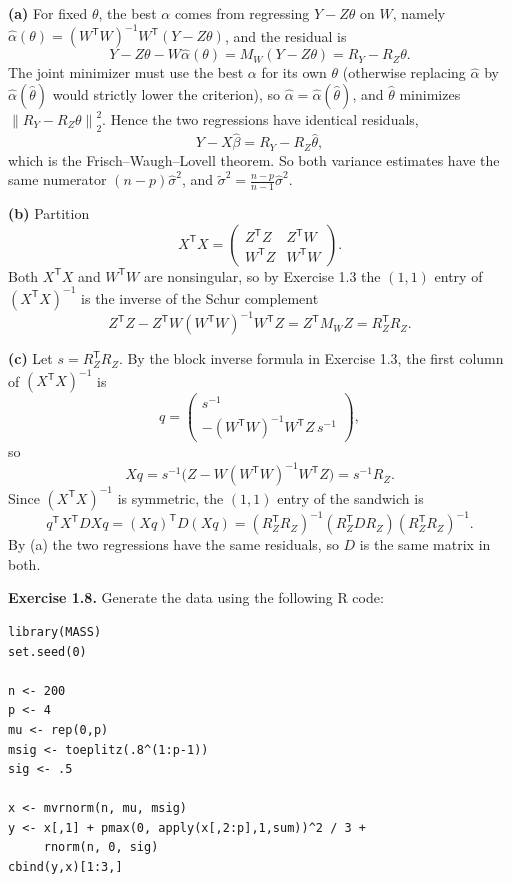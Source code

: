 \documentclass[answers,12pt,addpoints]{exam}
\newcommand{\trans}{^{\mathsf T}}
\newcommand{\normtwo}[1]{\left\lVert #1\right\rVert_2}
\begin{document}
\begin{questions}
\begin{solution}
\textbf{(a)} For fixed $\theta$, the best $\alpha$ comes from regressing
$Y-Z\theta$ on $W$, namely
$\widehat\alpha(\theta)=(W\trans W)^{-1}W\trans(Y-Z\theta)$, and the residual is
\[
Y-Z\theta-W\widehat\alpha(\theta)=M_W(Y-Z\theta)=R_Y-R_Z\theta .
\]
The joint minimizer must use the best $\alpha$ for its own $\theta$ (otherwise
replacing $\widehat\alpha$ by $\widehat\alpha(\widehat\theta)$ would strictly
lower the criterion), so $\widehat\alpha=\widehat\alpha(\widehat\theta)$, and
$\widehat\theta$ minimizes $\normtwo{R_Y-R_Z\theta}^2$. Hence the two
regressions have identical residuals,
\[
Y-X\widehat\beta=R_Y-R_Z\widehat\theta ,
\]
which is the Frisch--Waugh--Lovell theorem. So both variance estimates have the
same numerator $(n-p)\widehat\sigma^2$, and
$\widetilde\sigma^2=\frac{n-p}{n-1}\widehat\sigma^2$.
 
\textbf{(b)} Partition
\[
X\trans X=\begin{pmatrix}Z\trans Z&Z\trans W\\ W\trans Z&W\trans W\end{pmatrix}.
\]
Both $X\trans X$ and $W\trans W$ are nonsingular, so by Exercise 1.3 the
$(1,1)$ entry of $(X\trans X)^{-1}$ is the inverse of the Schur complement
\[
Z\trans Z-Z\trans W(W\trans W)^{-1}W\trans Z=Z\trans M_WZ=R_Z\trans R_Z .
\]
 
\textbf{(c)} Let $s=R_Z\trans R_Z$. By the block inverse formula in Exercise
1.3, the first column of $(X\trans X)^{-1}$ is
\[
q=\begin{pmatrix}s^{-1}\\ -(W\trans W)^{-1}W\trans Z\,s^{-1}\end{pmatrix},
\]
so
\[
Xq=s^{-1}\bigl(Z-W(W\trans W)^{-1}W\trans Z\bigr)=s^{-1}R_Z .
\]
Since $(X\trans X)^{-1}$ is symmetric, the $(1,1)$ entry of the sandwich is
\[
q\trans X\trans DXq=(Xq)\trans D(Xq)
=(R_Z\trans R_Z)^{-1}(R_Z\trans DR_Z)(R_Z\trans R_Z)^{-1}.
\]
By (a) the two regressions have the same residuals, so $D$ is the same matrix
in both.
\end{solution}
 
\question \textbf{Exercise 1.8.}
Generate the data using the following R code:
\begin{lstlisting}
library(MASS)
set.seed(0)
 
n <- 200
p <- 4
mu <- rep(0,p)
msig <- toeplitz(.8^(1:p-1))
sig <- .5
 
x <- mvrnorm(n, mu, msig)
y <- x[,1] + pmax(0, apply(x[,2:p],1,sum))^2 / 3 +
     rnorm(n, 0, sig)
cbind(y,x)[1:3,]
\end{lstlisting}
 

\end{questions}
\end{document}
